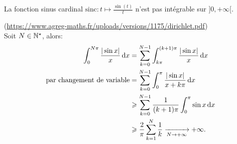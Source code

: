 \begin{prop}
    La fonction sinus cardinal $\mathrm{sinc}:t \mapsto \frac{\sin(t)}{t}$ n'est pas intégrable sur $]0, +\infty[$.
\end{prop}

\begin{preuve}
    (\url{https://www.agreg-maths.fr/uploads/versions/1175/dirichlet.pdf}) \\
    Soit $N \in \mathbb{N}^\star$, alors:
    \begin{align*}
        \int_0^{N \pi} \frac{|\sin x|}{x} \, \mathrm{d} x &= \sum_{k=0}^{N-1} \int_{k \pi}^{(k+1) \pi} \frac{|\sin x|}{x} \, \mathrm{d} x \\
        \text{ par changement de variable} &= \sum_{k=0}^{N-1} \int_0^\pi \frac{|\sin x|}{x + k \pi} \, \mathrm{d} x \\
        &\geqslant \sum_{k=0}^{N-1} \frac{1}{(k+1) \pi} \int_0^\pi \sin x \, \mathrm{d} x \\
        &\geqslant \frac{2}{\pi} \sum_{k=1}^N \frac{1}{k} \xrightarrow[N \to + \infty]{} + \infty.
    \end{align*}
\end{preuve}